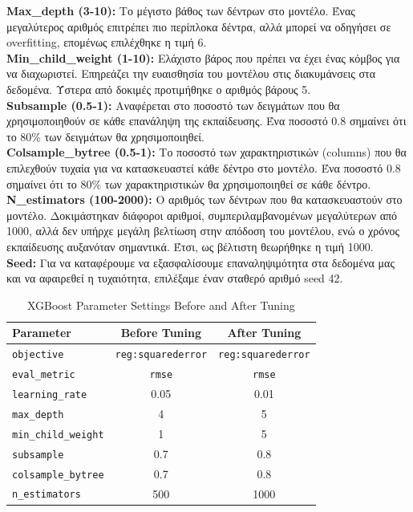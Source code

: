 \documentclass{llncs}
\begin{document}
\noindent \textbf{Max\_depth (3-10):}
Το μέγιστο βάθος των δέντρων στο μοντέλο. Ένας μεγαλύτερος αριθμός επιτρέπει πιο περίπλοκα δέντρα, αλλά μπορεί να οδηγήσει σε overfitting, επομένως επιλέχθηκε η τιμή 6. \\

\noindent \textbf{Min\_child\_weight (1-10):}
Ελάχιστο βάρος που πρέπει να έχει ένας κόμβος για να διαχωριστεί. Επηρεάζει την ευαισθησία του μοντέλου στις διακυμάνσεις στα δεδομένα. Ύστερα από δοκιμές προτιμήθηκε ο αριθμός βάρους 5.\\

\noindent \textbf{Subsample (0.5-1):}
Αναφέρεται στο ποσοστό των δειγμάτων που θα χρησιμοποιηθούν σε κάθε επανάληψη της εκπαίδευσης. Ένα ποσοστό 0.8 σημαίνει ότι το 80\% των δειγμάτων θα χρησιμοποιηθεί.\\

\noindent \textbf{Colsample\_bytree (0.5-1):}
Το ποσοστό των χαρακτηριστικών (columns) που θα επιλεχθούν τυχαία για να κατασκευαστεί κάθε δέντρο στο μοντέλο. Ένα ποσοστό 0.8 σημαίνει ότι το 80\% των χαρακτηριστικών θα χρησιμοποιηθεί σε κάθε δέντρο.\\

\noindent \textbf{N\_estimators (100-2000):}
Ο αριθμός των δέντρων που θα κατασκευαστούν στο μοντέλο. Δοκιμάστηκαν διάφοροι αριθμοί, συμπεριλαμβανομένων μεγαλύτερων από 1000, αλλά δεν υπήρχε μεγάλη βελτίωση στην απόδοση του μοντέλου, ενώ ο χρόνος εκπαίδευσης αυξανόταν σημαντικά. Έτσι, ως βέλτιστη θεωρήθηκε η τιμή 1000.\\

\noindent \textbf{Seed:}
Για να καταφέρουμε να εξασφαλίσουμε επαναληψιμότητα στα δεδομένα μας και να αφαιρεθεί η τυχαιότητα, επιλέξαμε έναν σταθερό αριθμό seed 42. \\

\begin{table}[h!]
    \centering
    \begin{tabular}{l|cc}
        \hline
        Parameter & Before Tuning & After Tuning \\
        \hline
        \texttt{objective} & \texttt{reg:squarederror} & \texttt{reg:squarederror} \\
        \texttt{eval\_metric} & \texttt{rmse} & \texttt{rmse} \\
        \texttt{learning\_rate} & 0.05 & 0.01 \\
        \texttt{max\_depth} & 4 & 5 \\
        \texttt{min\_child\_weight} & 1 & 5 \\
        \texttt{subsample} & 0.7 & 0.8 \\
        \texttt{colsample\_bytree} & 0.7 & 0.8 \\
        \texttt{n\_estimators} & 500 & 1000 \\
        \hline
    \end{tabular}
    \caption{XGBoost Parameter Settings Before and After Tuning}
\end{table}
\end{document}
